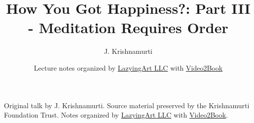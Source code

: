 \documentclass[11pt,oneside]{book}
\begin{document}
\frontmatter
\title{How You Got Happiness?: Part III - Meditation Requires Order}
\author{J. Krishnamurti}
\date{Lecture notes organized by \href{https://lazying.art}{LazyingArt LLC} with \href{https://github.com/lachlanchen/Video2Book}{Video2Book}}
\maketitle
\begin{center}
\small Original talk by J. Krishnamurti. Source material preserved by the Krishnamurti Foundation Trust. Notes organized by \href{https://lazying.art}{LazyingArt LLC} with \href{https://github.com/lachlanchen/Video2Book}{Video2Book}.
\end{center}
\clearpage
\mainmatter

\end{document}
